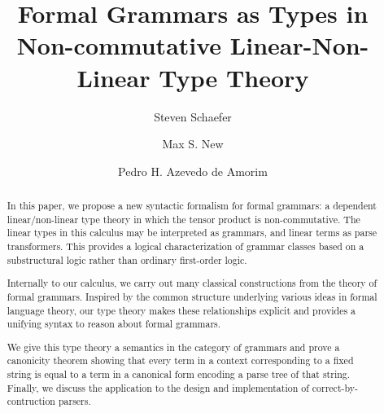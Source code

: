 \documentclass[sigconf,anonymous,review,screen]{acmart}
\newif\ifdraft
\begin{document}
\pagestyle{plain}

\pagebreak

\ifdraft{
\listoftodos{list of todos}
\pagebreak}\fi

\title{Formal Grammars as Types in Non-commutative Linear-Non-Linear Type Theory}

\author{Steven Schaefer}

\author{Max S. New}

\author{Pedro H. Azevedo de Amorim}

\makeatletter
\let\@authorsaddresses\@empty
\makeatother

\begin{abstract}
  In this paper, we propose a new syntactic formalism for formal grammars: a
  dependent linear/non-linear type theory in which the tensor product is
  non-commutative. The linear types in this calculus may be interpreted as
  grammars, and linear terms as parse transformers. This provides a logical
  characterization of grammar classes based on a substructural logic rather than
  ordinary first-order logic.

  Internally to our calculus, we carry out many classical constructions from
  the theory of formal grammars. Inspired by the common
  structure underlying various ideas in formal language
  theory, our type theory makes these relationships explicit
  and provides a unifying syntax to reason about formal
  grammars.

  We give this type theory a semantics in the category of grammars and prove a
  canonicity theorem showing that every term in a context corresponding to a
  fixed string is equal to a term in a canonical form encoding a parse tree of
  that string. Finally, we discuss the application to the design and
  implementation of correct-by-contruction parsers.
\end{abstract}

\maketitle
\end{document}
